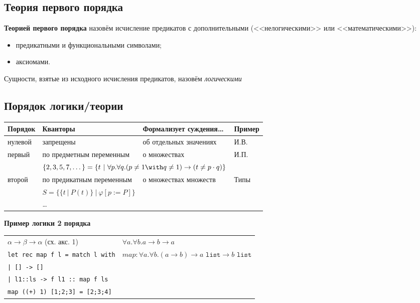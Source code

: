 \subsection{Теория первого порядка}

\textbf{Теорией первого порядка} назовём исчисление предикатов с дополнительными (<<нелогическими>>
или <<математическими>>):
\begin{itemize}
\item предикатными и функциональными символами;
\item аксиомами.
\end{itemize}

Сущности, взятые из исходного исчисления предикатов, назовём \emph{логическими}

\subsection{Порядок логики/теории}

\begin{tabular}{llll}
Порядок & Кванторы & Формализует суждения\dots & Пример\\\hline
нулевой & запрещены & об отдельных значениях & И.В.\\
первый & по предметным переменным & о множествах & И.П.\\
    &   \multicolumn{2}{l}{\color{olive}$\{2,3,5,7,\dots\} = \{ t\ |\ \forall p.\forall q.(p \ne 1 \with q \ne 1) \rightarrow (t \ne p\cdot q)\}$}\\
второй & по предикатным переменным & о множествах множеств & Типы\\
    &   \multicolumn{2}{l}{\color{olive}$S = \{ \{t\ |\ P(t)\}\ |\ \varphi[p := P] \}$}\\
 & \dots 
\end{tabular}

\textbf{Пример логики 2 порядка}
\begin{tabular}{ll}
$\alpha\rightarrow\beta\rightarrow\alpha$ (сх. акс. 1) & $\forall a.\forall b.a \rightarrow b \rightarrow a$ \vspace{0.1cm}\\
\texttt{let rec map f l = match l with} & $map: \forall a.\forall b.(a \rightarrow b) \rightarrow a\texttt{ list} \rightarrow b\texttt{ list}$ \\
\texttt{| [] -> []} \\
\texttt{| l1::ls -> f l1 :: map f ls}\vspace{0.1cm}\\
\texttt{map ((+) 1) [1;2;3] = [2;3;4]}
\end{tabular}


